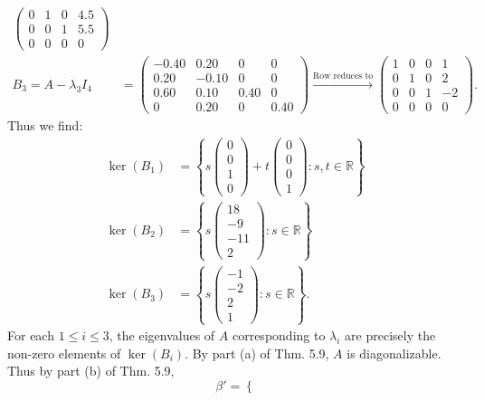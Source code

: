\documentclass[12pt]{article}
\begin{document}
\begin{enumerate}
\begin{align*}
\begin{pmatrix}
0 & 1 & 0 & 4.5 \\
0 & 0 & 1 & 5.5 \\
0 & 0 & 0 & 0
\end{pmatrix} \\
B_3 = A - \lambda_3 I_4 &= \begin{pmatrix}
-0.40 & 0.20 & 0 & 0 \\
0.20 & -0.10 & 0 & 0 \\
0.60 & 0.10 & 0.40 & 0 \\
0 & 0.20 & 0 & 0.40
\end{pmatrix}
\xrightarrow{\text{Row reduces to}}
\begin{pmatrix}
1 & 0 & 0 & 1 \\
0 & 1 & 0 & 2 \\
0 & 0 & 1 & -2 \\
0 & 0 & 0 & 0
\end{pmatrix}.
\end{align*}
Thus we find:
\begin{align*}
\ker(B_1) &= \left\{
s \begin{pmatrix}
0 \\
0 \\
1 \\
0
\end{pmatrix} +
t \begin{pmatrix}
0 \\
0 \\
0 \\
1
\end{pmatrix} : s, t \in \mathbb{R}
\right\} \\
\ker(B_2) &= \left\{
s \begin{pmatrix}
18 \\
-9 \\
-11 \\
2
\end{pmatrix} : s \in \mathbb{R}
\right\} \\
\ker(B_3) &= \left\{
s \begin{pmatrix}
-1 \\
-2 \\
2 \\
1
\end{pmatrix} : s \in \mathbb{R}
\right\}.
\end{align*}
For each $1 \leq i \leq 3$, the eigenvalues of $A$ corresponding to $\lambda_i$ are precisely the non-zero elements of $\ker(B_i)$. By part (a) of Thm. 5.9, $A$ is diagonalizable. Thus by part (b) of Thm. 5.9,
\begin{equation*}
\beta' = \left\{

\end{equation*}
\end{enumerate}
\end{document}
